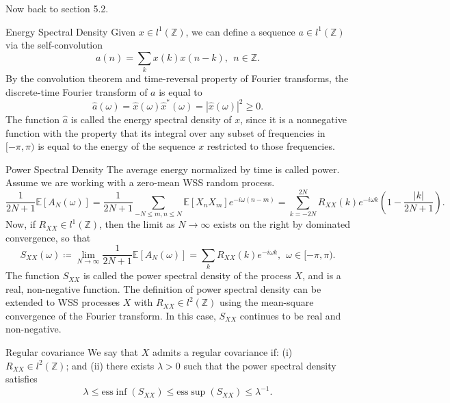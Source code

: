 \documentclass{article}
\begin{document}
Now back to section 5.2.



\begin{defn}{Energy Spectral Density}{}
Given \( x \in l^1(\mathbb{Z} )  \), we can define a sequence \( a \in l^1(\mathbb{Z} ) \) via the self-convolution 
\[
    a(n) = \sum_{k} x(k)x(n - k),  \ \ n \in \mathbb{Z}. 
\]
By the convolution theorem and time-reversal property of Fourier transforms, the discrete-time Fourier transform of \( a \) is equal to 
\[
    \hat{a} (\omega ) = \hat{x} (\omega )\hat{x} ^{\ast} (\omega ) = |\hat{x} (\omega )| ^{2} \geq 0. 
\]
The function \( \hat{a}  \) is called the energy spectral density of \( x \), since it is a nonnegative function with the property that its integral over any subset of frequencies in \( [- \pi , \pi ) \) is equal to the energy of the sequence \( x \) restricted to those frequencies. 
\end{defn}

\begin{defn}{Power Spectral Density}{}
    The average energy normalized by time is called power. Assume we are working with a zero-mean WSS random process. 
    \[
        \frac{1}{2N + 1} \mathbb{E} [A_{N} (\omega )] = \frac{1}{2N + 1} \sum_{- N\leq m,n \leq N } \mathbb{E} [X_{n} X_{m} ] e^{-i \omega (n - m)}  = \sum_{k = - 2N}^{2N} R_{XX}(k) e^{-i \omega k}\left( 1 - \frac{\left\lvert k \right\rvert }{2N + 1}  \right)    . 
    \]
    Now, if \( R_{ X X} \in l^1(\mathbb{Z} ) \), then the limit as \( N \to  \infty \) exists on the right by dominated convergence, so that 
    \[
        S_{X X} (\omega )\coloneqq \lim_{N \to \infty} \frac{1}{2N + 1}\mathbb{E} [A_{N} (\omega )] = \sum_{k}R_{X X}(k) e^{- i \omega k}, \ \ \omega \in [- \pi ,\pi ).  
    \]
    The function \( S_{X X} \) is called the power spectral density of the process \( X \), and is a real, non-negative function. The definition of power spectral density can be extended to WSS processes \( X \) with \( R_{X X} \in  l^2(\mathbb{Z} ) \) using the mean-square convergence of the Fourier transform. In this case, \( S_{X X} \) continues to be real and non-negative. 
\end{defn}
\begin{defn}{Regular covariance}{}
We say that \( X \) admits a regular covariance if: (i) \( R_{X X } \in l^2(\mathbb{Z} ) \); and (ii) there exists \( \lambda >0 \) such that the power spectral density satisfies
\[
    \lambda \leq \mathrm{ess}\inf (S_{XX}) \leq \mathrm{ess}\sup (S_{XX}) \leq \lambda ^{-1} . 
\]
\end{defn}
\end{document}
